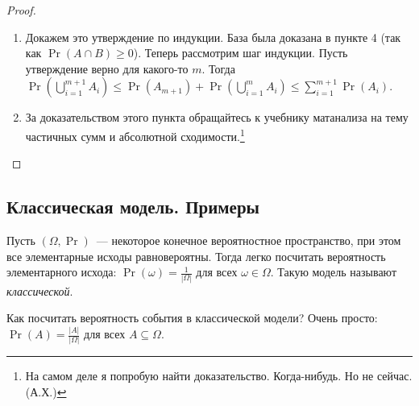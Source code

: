 \begin{proof}
\begin{enumerate}
        \item Докажем это утверждение по индукции. База была доказана в пункте 4 (так как \(\Pr(A \cap B) \geq 0\)). Теперь рассмотрим шаг индукции. Пусть утверждение верно для какого-то \(m\). Тогда
        \(\Pr\left(\bigcup\limits_{i = 1}^{m + 1} A_i\right) \leq \Pr(A_{m + 1}) + \Pr\left(\bigcup\limits_{i = 1}^{m} A_i\right) \leq \sum\limits_{i = 1}^{m + 1} \Pr(A_i)\).
        
        \item За доказательством этого пункта обращайтесь к учебнику матанализа на тему частичных сумм и абсолютной сходимости.\footnote{На самом деле я попробую найти доказательство. Когда-нибудь. Но не сейчас. (А.Х.)}
    \end{enumerate}
\end{proof}

\subsection{Классическая модель. Примеры}
Пусть \((\Omega, \Pr)\)~--- некоторое конечное вероятностное пространство, при этом все элементарные исходы равновероятны. Тогда легко посчитать вероятность элементарного исхода: \(\Pr(\omega) = \frac{1}{|\Omega|}\) для всех \(\omega \in \Omega\). Такую модель называют \emph{классической}.

Как посчитать вероятность события в классической модели? Очень просто: \(\Pr(A) = \frac{|A|}{|\Omega|}\) для всех \(A \subseteq \Omega\).

